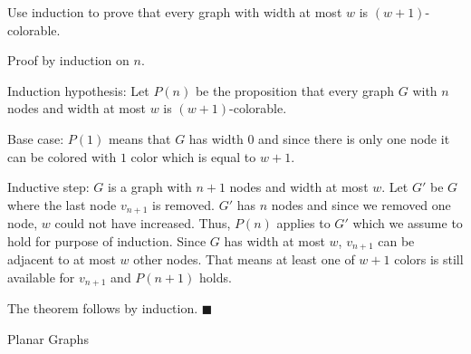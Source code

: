 \documentclass[../main.tex]{subfiles}
\begin{document}
\begin{questions}

  \question Use induction to prove that every graph with width at most $w$ is $(w+1)$-colorable.
  \begin{solution}

    Proof by induction on $n$.

    Induction hypothesis: Let $P(n)$ be the proposition that every graph $G$ with $n$ nodes and width at most $w$ is $(w+1)$-colorable.

    Base case: $P(1)$ means that $G$ has width $0$ and since there is only one node it can be colored with $1$ color which is equal to $w+1$.

    Inductive step: $G$ is a graph with $n+1$ nodes and width at most $w$. Let $G'$ be $G$ where the last node $v_{n+1}$ is removed. $G'$ has $n$ nodes and since we removed one node, $w$ could not have increased. Thus, $P(n)$ applies to $G'$ which we assume to hold for purpose of induction. Since $G$ has width at most $w$, $v_{n+1}$ can be adjacent to at most $w$ other nodes. That means at least one of $w+1$ colors is still available for $v_{n+1}$ and $P(n+1)$ holds.

    The theorem follows by induction. $\blacksquare$
  \end{solution}

  \question Planar Graphs
\end{questions}
\end{document}
